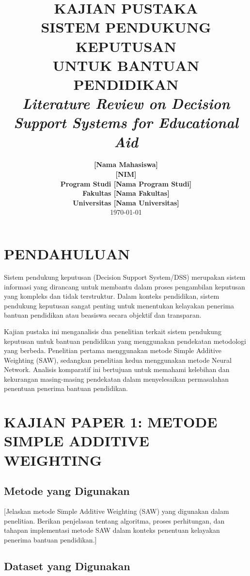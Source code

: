 \documentclass[10pt,a4paper]{article}
\title{
    \vspace{-2cm}
    \Huge\textbf{KAJIAN PUSTAKA}\\
    \vspace{0.5cm}
    \Large\textbf{SISTEM PENDUKUNG KEPUTUSAN}\\
    \Large\textbf{UNTUK BANTUAN PENDIDIKAN}\\
    \vspace{1cm}
    \normalsize\textit{Literature Review on Decision Support Systems for Educational Aid}
}
\author{
    \textbf{[Nama Mahasiswa]}\\
    \textbf{[NIM]}\\
    \vspace{0.5cm}
    \textbf{Program Studi [Nama Program Studi]}\\
    \textbf{Fakultas [Nama Fakultas]}\\
    \textbf{Universitas [Nama Universitas]}\\
    \vspace{1cm}
    \today
}
\date{}
\begin{document}
\maketitle
\thispagestyle{empty}
\newpage

\tableofcontents
\thispagestyle{empty}
\newpage

\setcounter{page}{1}

\section{PENDAHULUAN}

Sistem pendukung keputusan (Decision Support System/DSS) merupakan sistem informasi yang dirancang untuk membantu dalam proses pengambilan keputusan yang kompleks dan tidak terstruktur. Dalam konteks pendidikan, sistem pendukung keputusan sangat penting untuk menentukan kelayakan penerima bantuan pendidikan atau beasiswa secara objektif dan transparan.

Kajian pustaka ini menganalisis dua penelitian terkait sistem pendukung keputusan untuk bantuan pendidikan yang menggunakan pendekatan metodologi yang berbeda. Penelitian pertama menggunakan metode Simple Additive Weighting (SAW), sedangkan penelitian kedua menggunakan metode Neural Network. Analisis komparatif ini bertujuan untuk memahami kelebihan dan kekurangan masing-masing pendekatan dalam menyelesaikan permasalahan penentuan penerima bantuan pendidikan.

\section{KAJIAN PAPER 1: METODE SIMPLE ADDITIVE WEIGHTING}

\subsection{Metode yang Digunakan}

[Jelaskan metode Simple Additive Weighting (SAW) yang digunakan dalam penelitian. Berikan penjelasan tentang algoritma, proses perhitungan, dan tahapan implementasi metode SAW dalam konteks penentuan kelayakan penerima bantuan pendidikan.]

\subsection{Dataset yang Digunakan}
\end{document}
